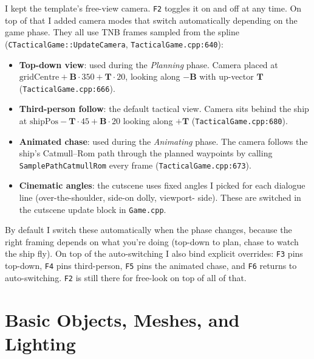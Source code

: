\documentclass[11pt,a4paper]{article}
\begin{document}
I kept the template's free-view camera. \texttt{F2} toggles it on and off at
any time. On top of that I added camera modes that switch automatically
depending on the game phase. They all use TNB frames sampled from the spline
(\texttt{CTacticalGame::UpdateCamera}, \texttt{TacticalGame.cpp:640}):

\begin{itemize}
  \item \textbf{Top-down view}: used during the \emph{Planning} phase.
        Camera placed at
        $\mathrm{gridCentre} + \mathbf{B}\cdot 350 + \mathbf{T}\cdot 20$,
        looking along $-\mathbf{B}$ with up-vector $\mathbf{T}$
        (\texttt{TacticalGame.cpp:666}).
  \item \textbf{Third-person follow}: the default tactical view. Camera sits
        behind the ship at
        $\mathrm{shipPos} - \mathbf{T}\cdot 45 + \mathbf{B}\cdot 20$ looking
        along $+\mathbf{T}$ (\texttt{TacticalGame.cpp:680}).
  \item \textbf{Animated chase}: used during the \emph{Animating} phase. The
        camera follows the ship's Catmull--Rom path through the planned
        waypoints by calling \texttt{SamplePathCatmullRom} every frame
        (\texttt{TacticalGame.cpp:673}).
  \item \textbf{Cinematic angles}: the cutscene uses fixed angles I picked
        for each dialogue line (over-the-shoulder, side-on dolly, viewport-
        side). These are switched in the cutscene update block in
        \texttt{Game.cpp}.
\end{itemize}

By default I switch these automatically when the phase changes, because
the right framing depends on what you're doing (top-down to plan, chase
to watch the ship fly). On top of the auto-switching I also bind explicit
overrides: \texttt{F3} pins top-down, \texttt{F4} pins third-person,
\texttt{F5} pins the animated chase, and \texttt{F6} returns to
auto-switching. \texttt{F2} is still there for free-look on top of all
of that.


\section{Basic Objects, Meshes, and Lighting}

\end{document}
